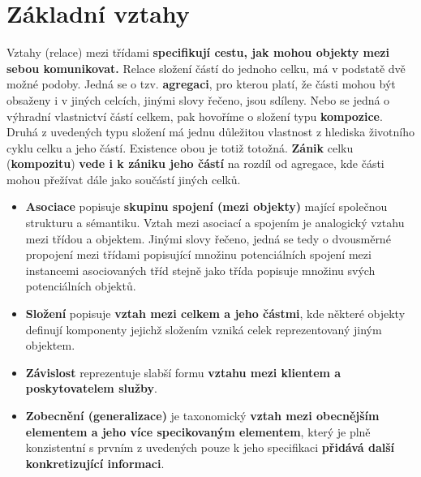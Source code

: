 \section{Základní vztahy}
Vztahy (relace) mezi třídami \textbf{specifikují cestu, jak mohou objekty mezi sebou komunikovat.} Relace složení částí do jednoho celku, má v podstatě dvě možné podoby.  Jedná se  o tzv. \textbf{agregaci}, pro kterou platí, že části mohou být obsaženy i v jiných celcích, jinými slovy řečeno, jsou sdíleny.  Nebo se jedná o výhradní vlastnictví částí celkem, pak hovoříme o  složení typu \textbf{kompozice}.  Druhá z uvedených typu složení má jednu důležitou vlastnost  z hlediska životního cyklu celku a jeho částí.  Existence obou je totiž totožná.  \textbf{Zánik} celku  (\textbf{kompozitu}) \textbf{vede i k zániku jeho částí} na rozdíl od agregace, kde části mohou přežívat dále jako součástí jiných celků.
\begin{itemize}
    \item \textbf{Asociace} popisuje\textbf{ skupinu spojení (mezi objekty)} mající společnou strukturu a sémantiku. Vztah mezi asociací a spojením je analogický vztahu mezi třídou a objektem. Jinými slovy řečeno, jedná se tedy o dvousměrné propojení mezi třídami popisující množinu potenciálních spojení mezi instancemi asociovaných tříd stejně jako třída popisuje množinu svých potenciálních objektů.
    \item \textbf{Složení} popisuje \textbf{vztah mezi celkem a jeho částmi}, kde některé objekty definují komponenty jejichž složením vzniká celek reprezentovaný jiným objektem.
    \item \textbf{Závislost} reprezentuje slabší formu \textbf{vztahu mezi klientem a poskytovatelem služby}.
    \item \textbf{Zobecnění (generalizace)} je taxonomický \textbf{vztah mezi obecnějším elementem a jeho více specikovaným elementem}, který je plně konzistentní s prvním z uvedených pouze k jeho specifikaci \textbf{přidává další konkretizující informaci}.
\end{itemize}


